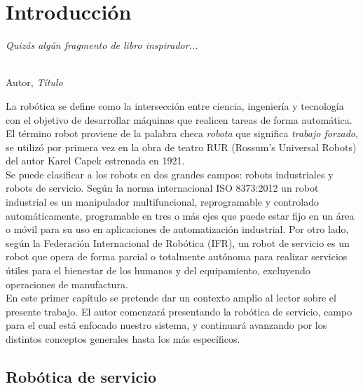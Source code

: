 \chapter{Introducción}
\label{cap:capitulo1}
\setcounter{page}{1}

\begin{flushright}
\begin{minipage}[]{10cm}
\emph{Quizás algún fragmento de libro inspirador...}\\
\end{minipage}\\

Autor, \textit{Título}\\
\end{flushright}

\vspace{1cm}

La robótica se define como la intersección entre ciencia, ingeniería y tecnología con el objetivo de desarrollar máquinas que realicen tareas de forma automática. El término robot proviene de la palabra checa \textit{robota} que significa \textit{trabajo forzado}, se utilizó por primera vez en la obra de teatro RUR (Rossum's Universal Robots) del autor Karel Capek estrenada en 1921.\\

Se puede clasificar a los robots en dos grandes campos: robots industriales y robots de servicio. Según la norma internacional ISO 8373:2012 un robot industrial es un manipulador multifuncional, reprogramable y controlado automáticamente, programable en tres o más ejes que puede estar fijo en un área o móvil para su uso en aplicaciones de automatización industrial. Por otro lado, según la Federación Internacional de Robótica (IFR), un robot de servicio es un robot que opera de forma parcial o totalmente autónoma para realizar servicios útiles para el bienestar de los humanos y del equipamiento, excluyendo operaciones de manufactura.\\

En este primer capítulo se pretende dar un contexto amplio al lector sobre el presente trabajo. El autor comenzará presentando la robótica de servicio, campo para el cual está enfocado nuestro sistema, y continuará avanzando por los distintos conceptos generales hasta los más específicos.

\section{Robótica de servicio}
\label{sec:robotica} %

